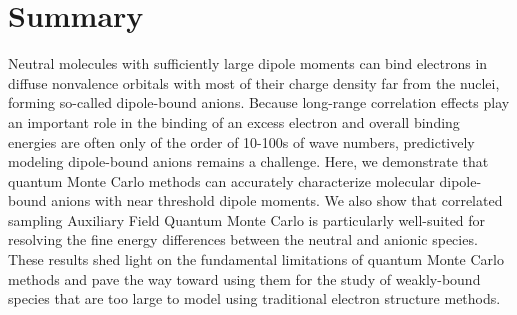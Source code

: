 \section{Summary}
Neutral molecules with sufficiently large dipole moments can bind electrons in diffuse nonvalence orbitals with most of their charge density far from the nuclei, forming so-called dipole-bound anions. 
Because long-range correlation effects play an important role in the binding of an excess electron and overall binding energies are often only of the order of 10-100s of wave numbers, predictively modeling dipole-bound anions remains a challenge.
Here, we demonstrate that quantum Monte Carlo methods can accurately characterize molecular dipole-bound anions with near threshold dipole moments.
We also show that correlated sampling Auxiliary Field Quantum Monte Carlo is particularly well-suited for resolving the fine energy differences between the neutral and anionic species.
These results shed light on the fundamental limitations of quantum Monte Carlo methods and pave the way toward using them for the study of weakly-bound species that are too large to model using traditional electron structure methods. 

